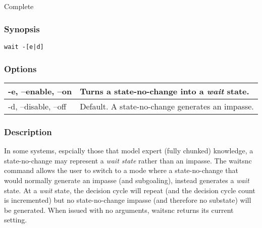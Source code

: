 \subsection{}
\label{waitsnc}
 Complete
\subsubsection*{Synopsis}
\begin{verbatim}
wait -[e|d]
\end{verbatim}
\subsubsection*{Options}
\begin{tabular}{|l|l|}
\hline 
 -e, --enable, --on  & Turns a state-no-change into a \emph{wait}
 state.  \\
 \hline 
 -d, --disable, --off  & Default. A state-no-change generates an impasse.  \\
 \hline 
\end{tabular}
\subsubsection*{Description}
 In some systems, espcially those that model expert (fully chunked) knowledge, a state-no-change may represent a \emph{wait state}
 rather than an impasse. The waitsnc command allows the user to switch to a mode where a state-no-change that would normally generate an impasse (and subgoaling), instead generates a \emph{wait}
 state. At a \emph{wait}
 state, the decision cycle will repeat (and the decision cycle count is incremented) but no state-no-change impasse (and therefore no substate) will be generated. 
 When issued with no arguments, waitsnc returns its current setting. 
